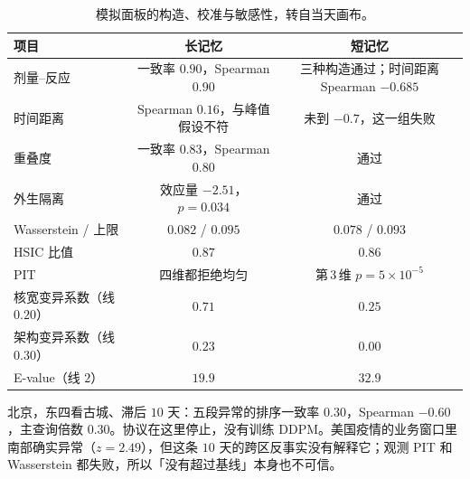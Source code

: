 \documentclass[11pt,a4paper,fontset=none]{ctexart}
\begin{document}
\begin{table}[ht]
\centering
\caption{模拟面板的构造、校准与敏感性，转自当天画布。}
\label{tab:cf-cal}
\small
\begin{tabular}{@{}lcc@{}}
\toprule
项目 & 长记忆 & 短记忆 \\
\midrule
剂量--反应 & 一致率 \(0.90\)，Spearman \(0.90\) & 三种构造通过；时间距离 Spearman \(-0.685\) \\
时间距离 & Spearman \(0.16\)，与峰值假设不符 & 未到 \(-0.7\)，这一组失败 \\
重叠度 & 一致率 \(0.83\)，Spearman \(0.80\) & 通过 \\
外生隔离 & 效应量 \(-2.51\)，\(p=0.034\) & 通过 \\
Wasserstein / 上限 & \(0.082\) / \(0.095\) & \(0.078\) / \(0.093\) \\
HSIC 比值 & \(0.87\) & \(0.86\) \\
PIT & 四维都拒绝均匀 & 第\,3\,维 \(p=5\times 10^{-5}\) \\
核宽变异系数（线 \(0.20\)） & \(0.71\) & \(0.25\) \\
架构变异系数（线 \(0.30\)） & \(0.23\) & \(0.00\) \\
E-value（线 \(2\)） & \(19.9\) & \(32.9\) \\
\bottomrule
\end{tabular}
\end{table}

北京，东四看古城、滞后 \(10\) 天：五段异常的排序一致率 \(0.30\)，Spearman \(-0.60\)，主查询倍数 \(0.30\)。协议在这里停止，没有训练 DDPM。美国疫情的业务窗口里南部确实异常（\(z=2.49\)），但这条 \(10\) 天的跨区反事实没有解释它；观测 PIT 和 Wasserstein 都失败，所以「没有超过基线」本身也不可信。
\end{document}
